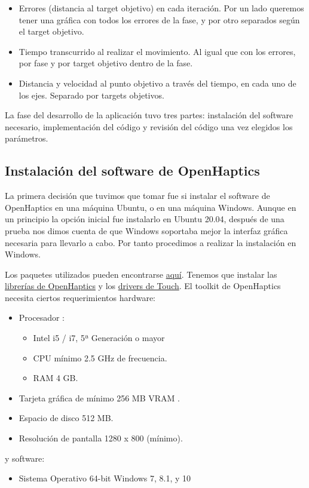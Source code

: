 \documentclass[a4paper,11pt, oneside]{book}
\begin{document}
\begin{itemize}
	\begin{itemize}
		\item Errores (distancia al target objetivo) en cada iteración. Por un lado queremos tener una gráfica con todos los errores de la fase, y por otro separados según el target objetivo.
		\item Tiempo transcurrido al realizar el movimiento. Al igual que con los errores, por fase y por target objetivo dentro de la fase.
		\item Distancia y velocidad al punto objetivo a través del tiempo, en cada uno de los ejes. Separado por targets objetivos.
	\end{itemize}
\end{itemize}


La fase del desarrollo de la aplicación tuvo tres partes: instalación del software necesario, implementación del código y revisión del código una vez elegidos los parámetros.

\subsection{Instalación del software de OpenHaptics}

La primera decisión que tuvimos que tomar fue si instalar el software de OpenHaptics en una máquina Ubuntu, o en una máquina Windows. Aunque en un principio la opción inicial fue instalarlo en Ubuntu 20.04, después de una prueba nos dimos cuenta de que Windows soportaba mejor la interfaz gráfica necesaria para llevarlo a cabo. Por tanto procedimos a realizar la instalación en Windows.

Los paquetes utilizados pueden encontrarse \href{https://support.3dsystems.com/s/article/OpenHaptics-for-Windows-Developer-Edition-v35?language=en\_US}{aquí}. Tenemos que instalar las \href{https://s3.amazonaws.com/dl.3dsystems.com/binaries/Sensable/OH/3.5/OpenHaptics_Developer_Edition_v3.5.0.zip}{librerías de OpenHaptics} y los \href{https://s3.amazonaws.com/dl.3dsystems.com/binaries/Sensable/driver/Touch_Device_Driver_2023.1.4.exe}{drivers de Touch}.
El toolkit de OpenHaptics necesita ciertos requerimientos hardware:
\begin{itemize}
	\item Procesador : 
	\begin{itemize}
		\item Intel i5 / i7, 5ª Generación o mayor 
		\item CPU mínimo 2.5 GHz de frecuencia.
		\item RAM 4 GB.
	\end{itemize}
	\item Tarjeta gráfica de mínimo 256 MB VRAM .
	\item Espacio de disco 512 MB.
	\item Resolución de pantalla 1280 x 800 (mínimo).
\end{itemize}
y software:
\begin{itemize}
	\item Sistema Operativo 64-bit Windows 7, 8.1, y 10
\end{itemize}
\end{document}
